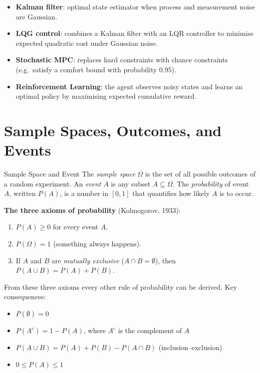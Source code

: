 \begin{itemize}[noitemsep]
  \item \textbf{Kalman filter}: optimal state estimator when process
        and measurement noise are Gaussian.
  \item \textbf{LQG control}: combines a Kalman filter with an LQR
        controller to minimise expected quadratic cost under Gaussian
        noise.
  \item \textbf{Stochastic MPC}: replaces hard constraints with
        chance constraints (e.g.\ satisfy a comfort bound with
        probability 0.95).
  \item \textbf{Reinforcement Learning}: the agent observes noisy
        states and learns an optimal policy by maximising expected
        cumulative reward.
\end{itemize}

\section{Sample Spaces, Outcomes, and Events}
\label{sec:app_sample_space}

\begin{defnbox}{Sample Space and Event}
The \emph{sample space} $\Omega$ is the set of all possible outcomes
of a random experiment.  An \emph{event} $A$ is any subset
$A \subseteq \Omega$.  The \emph{probability} of event $A$, written
$P(A)$, is a number in $[0,1]$ that quantifies how likely $A$ is to
occur.
\end{defnbox}

\textbf{The three axioms of probability} (Kolmogorov, 1933):
\begin{enumerate}[noitemsep]
  \item $P(A) \geq 0$ for every event $A$.
  \item $P(\Omega) = 1$ (something always happens).
  \item If $A$ and $B$ are \emph{mutually exclusive} ($A \cap B = \emptyset$),
        then $P(A \cup B) = P(A) + P(B)$.
\end{enumerate}

From these three axioms every other rule of probability can be derived.
Key consequences:
\begin{itemize}[noitemsep]
  \item $P(\emptyset) = 0$
  \item $P(A^c) = 1 - P(A)$, where $A^c$ is the complement of $A$
  \item $P(A \cup B) = P(A) + P(B) - P(A \cap B)$ (inclusion--exclusion)
  \item $0 \leq P(A) \leq 1$
\end{itemize}

